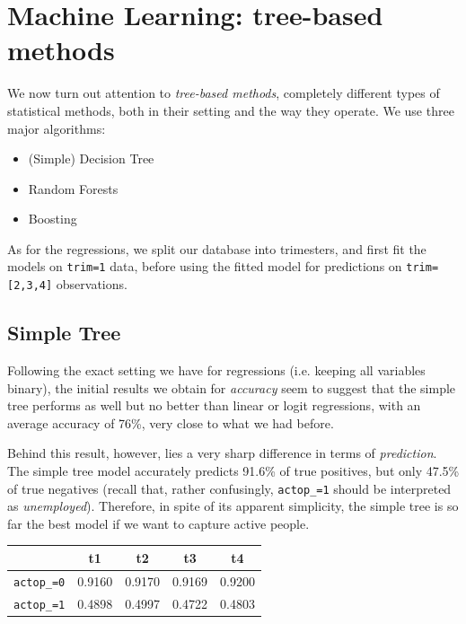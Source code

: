 \section{Machine Learning: tree-based methods}

We now turn out attention to \textit{tree-based methods}, completely different types of statistical methods, both in their setting and the way they operate. We use three major algorithms:

\begin{itemize}
    \item (Simple) Decision Tree
    \item Random Forests
    \item Boosting
\end{itemize}

As for the regressions, we split our database into trimesters, and first fit the models on \texttt{trim=1} data, before using the fitted model for predictions on \texttt{trim=[2,3,4]} observations.

\subsection{Simple Tree}

Following the exact setting we have for regressions (i.e. keeping all variables binary), the initial results we obtain for \textit{accuracy} seem to suggest that the simple tree performs as well but no better than linear or logit regressions, with an average accuracy of 76\%, very close to what we had before.

Behind this result, however, lies a very sharp difference in terms of \textit{prediction}. The simple tree model accurately predicts 91.6\% of true positives, but only 47.5\% of true negatives (recall that, rather confusingly, \texttt{actop\_=1} should be interpreted as \textit{unemployed}). Therefore, in spite of its apparent simplicity, the simple tree is so far the best model if we want to capture active people.

\begin{center}
    \begin{tabular}{lcccc}
        \hline
                           & t1     & t2     & t3     & t4     \\
        \hline
        \texttt{actop\_=0} & 0.9160 & 0.9170 & 0.9169 & 0.9200 \\
        \texttt{actop\_=1} & 0.4898 & 0.4997 & 0.4722 & 0.4803 \\
    \end{tabular}
\end{center}


